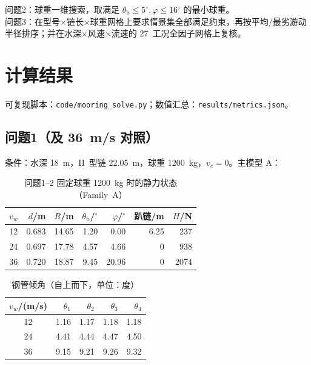 \documentclass[UTF8,a4paper,12pt]{ctexart}
\begin{document}
问题2：球重一维搜索，取满足 \(\theta_{\mathrm{b}}\le5^\circ,\varphi\le16^\circ\) 的最小球重。\\
问题3：在型号\(\times\)链长\(\times\)球重网格上要求情景集全部满足约束，再按平均/最劣游动半径排序；并在水深\(\times\)风速\(\times\)流速的 27~工况全因子网格上复核。

\section{计算结果}
\label{sec:results}

可复现脚本：\texttt{code/mooring\_solve.py}；数值汇总：\texttt{results/metrics.json}。

\subsection{问题1（及 \SI{36}{m/s} 对照）}
\label{sec:q1}

条件：水深 \SI{18}{m}，II~型链 \SI{22.05}{m}，球重 \SI{1200}{kg}，\(v_c=0\)。主模型 A：

\begin{table}[H]
\centering
\caption{问题1--2 固定球重 \SI{1200}{kg} 时的静力状态（Family~A）}
\label{tab:q1}
\begin{tabular}{crrrrrr}
\toprule
\(v_w\) & \(d\)/m & \(R\)/m & \(\theta_{\mathrm{b}}\)/\(^\circ\) & \(\varphi\)/\(^\circ\) & 趴链/m & \(H\)/N \\
\midrule
12 & 0.683 & 14.65 & 1.20 & 0.00 & 6.25 & 237 \\
24 & 0.697 & 17.78 & 4.57 & 4.66 & 0 & 938 \\
36 & 0.720 & 18.87 & 9.45 & 20.96 & 0 & 2074 \\
\bottomrule
\end{tabular}
\end{table}

\begin{table}[H]
\centering
\caption{钢管倾角（自上而下，单位：度）}
\label{tab:pipes}
\begin{tabular}{crrrr}
\toprule
\(v_w\)/(m/s) & \(\theta_1\) & \(\theta_2\) & \(\theta_3\) & \(\theta_4\) \\
\midrule
12 & 1.16 & 1.17 & 1.18 & 1.18 \\
24 & 4.41 & 4.44 & 4.47 & 4.50 \\
36 & 9.15 & 9.21 & 9.26 & 9.32 \\
\bottomrule
\end{tabular}
\end{table}
\end{document}
